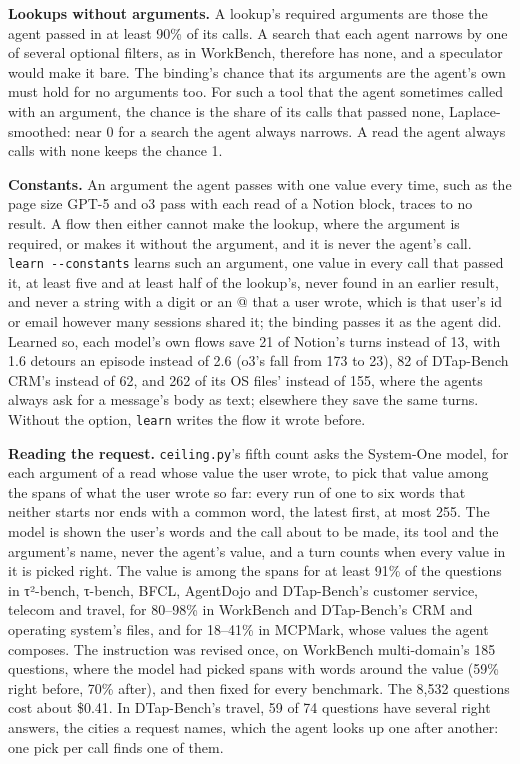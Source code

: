 \documentclass[10pt,twocolumn,letterpaper]{article}
\newcommand{\runin}[1]{{\sffamily\bfseries\color{accent}#1}}
\begin{document}
\runin{Lookups without arguments.} A lookup's required arguments are those the agent passed in at least 90\% of its calls. A search that each agent narrows by one of several optional filters, as in WorkBench, therefore has none, and a speculator would make it bare. The binding's chance that its arguments are the agent's own must hold for no arguments too. For such a tool that the agent sometimes called with an argument, the chance is the share of its calls that passed none, Laplace-smoothed: near 0 for a search the agent always narrows. A read the agent always calls with none keeps the chance 1.

\runin{Constants.} An argument the agent passes with one value every time, such as the page size GPT-5 and o3 pass with each read of a Notion block, traces to no result. A flow then either cannot make the lookup, where the argument is required, or makes it without the argument, and it is never the agent's call. \texttt{learn\ -\/-constants} learns such an argument, one value in every call that passed it, at least five and at least half of the lookup's, never found in an earlier result, and never a string with a digit or an @ that a user wrote, which is that user's id or email however many sessions shared it; the binding passes it as the agent did. Learned so, each model's own flows save 21 of Notion's turns instead of 13, with 1.6 detours an episode instead of 2.6 (o3's fall from 173 to 23), 82 of DTap-Bench CRM's instead of 62, and 262 of its OS files' instead of 155, where the agents always ask for a message's body as text; elsewhere they save the same turns. Without the option, \texttt{learn} writes the flow it wrote before.

\runin{Reading the request.} \texttt{ceiling.py}'s fifth count asks the System-One model, for each argument of a read whose value the user wrote, to pick that value among the spans of what the user wrote so far: every run of one to six words that neither starts nor ends with a common word, the latest first, at most 255. The model is shown the user's words and the call about to be made, its tool and the argument's name, never the agent's value, and a turn counts when every value in it is picked right. The value is among the spans for at least 91\% of the questions in τ²-bench, τ-bench, BFCL, AgentDojo and DTap-Bench's customer service, telecom and travel, for 80--98\% in WorkBench and DTap-Bench's CRM and operating system's files, and for 18--41\% in MCPMark, whose values the agent composes. The instruction was revised once, on WorkBench multi-domain's 185 questions, where the model had picked spans with words around the value (59\% right before, 70\% after), and then fixed for every benchmark. The 8,532 questions cost about \$0.41. In DTap-Bench's travel, 59 of 74 questions have several right answers, the cities a request names, which the agent looks up one after another: one pick per call finds one of them.
\end{document}

